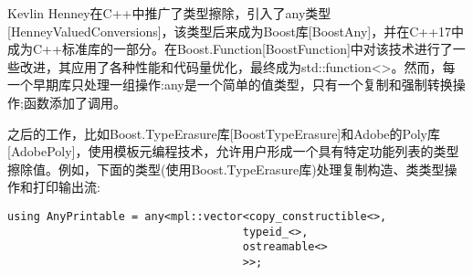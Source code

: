Kevlin Henney在C++中推广了类型擦除，引入了any类型[HenneyValuedConversions]，该类型后来成为Boost库[BoostAny]，并在C++17中成为C++标准库的一部分。在Boost.Function[BoostFunction]中对该技术进行了一些改进，其应用了各种性能和代码量优化，最终成为std::function<>。然而，每一个早期库只处理一组操作:any是一个简单的值类型，只有一个复制和强制转换操作;函数添加了调用。

之后的工作，比如Boost.TypeErasure库[BoostTypeErasure]和Adobe的Poly库[AdobePoly]，使用模板元编程技术，允许用户形成一个具有特定功能列表的类型擦除值。例如，下面的类型(使用Boost.TypeErasure库)处理复制构造、类类型操作和打印输出流:

\begin{lstlisting}[style=styleCXX]
using AnyPrintable = any<mpl::vector<copy_constructible<>,
									typeid_<>,
									ostreamable<>
									>>;
\end{lstlisting}